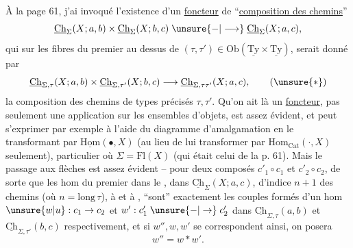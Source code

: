 À la page 61, j'ai invoqué l'existence d'un \uline{foncteur} de ``\uline{composition des chemins}''
\[
\underline{\mathrm{Ch}}_{\Sigma}(X;a,b)\times\underline{\mathrm{Ch}}_{\Sigma}(X;b,c)\mathrel{\unsure{-|\longrightarrow}}\underline{\mathrm{Ch}}_{\Sigma}(X;a,c),
\]
qui sur les fibres du premier  au dessus de $(\tau,\tau')\in\mathrm{Ob}(\underline{\mathrm{Ty}}\times\underline{\mathrm{Ty}})$, serait donné par
\[
\underline{\mathrm{Ch}}_{\Sigma,\tau}(X;a,b)\times\underline{\mathrm{Ch}}_{\Sigma,\tau'}(X;b,c)\longrightarrow\underline{\mathrm{Ch}}_{\Sigma,\tau\tau'}(X;a,c),\tag*{$(\unsure{*})$}
\]
la composition des chemins de types précisés $\tau,\tau'$. Qu'on ait là un \uline{foncteur}, pas seulement une application sur les ensembles d'objets, est assez évident, et peut s'exprimer par exemple à l'aide du diagramme d'amalgamation
en le transformant par $\underline{\mathrm{Hom}}(\bullet,X)$ (au lieu de lui  transformer par $\mathrm{Hom}_{\mathrm{Cat}}(\cdot,X)$ seulement),   particulier où $\Sigma=\mathrm{Fl}(X)$ (qui était celui de la p. 61). Mais le passage aux flèches est assez évident -- pour deux composés
$c'_1\circ c_1$ et $c'_2\circ c_2$, de sorte que les hom  du premier dans le , dans $\underline{\mathrm{Ch}}_{\Sigma}(X;a,c)$,   d'indice $n+1$ des  chemins (où $n=\mathrm{long}\,\tau$),  à   et à , ``sont'' exactement les couples
formés d'un hom $\unsure{w|u}:c_1\to c_2$ et $w':c'_1\mathrel{\unsure{-|\to}}c'_2$ dans $\underline{\mathrm{Ch}}_{\Sigma,\tau}(a,b)$ et $\underline{\mathrm{Ch}}_{\Sigma,\tau'}(b,c)$ respectivement, et si $w'',w,w'$ se correspondent ainsi, on posera
\[
w''=w*w'.
\]

